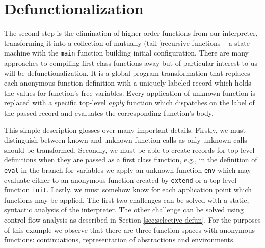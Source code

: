 \section{Defunctionalization}
The second step is the elimination of higher order functions from our interpreter, transforming it into a collection of mutually (tail-)recursive functions -- a state machine with the \lstinline{main} function building initial configuration.
There are many approaches to compiling first class functions away but of particular interest to us will be defunctionalization.
It is a global program transformation that replaces each anonymous function definition with a uniquely labeled record which holds the values for function's free variables.
Every application of unknown function is replaced with a specific top-level \textit{apply} function which dispatches on the label of the passed record and evaluates the corresponding function's body.

This simple description glosses over many important details.
Firstly, we must distinguish between known and unknown function calls as only unknown calls should be transformed.
Secondly, we must be able to create records for top-level definitions when they are passed as a first class function, e.g., in the definition of \lstinline{eval} in the branch for variables we apply an unknown function \lstinline{env} which may evaluate either to an anonymous function created by \lstinline{extend} or a top-level function \lstinline{init}.
Lastly, we must somehow know for each application point which functions may be applied.
The first two challenges can be solved with a static, syntactic analysis of the interpreter.
The other challenge can be solved using control-flow analysis as described in Section \ref{sec:selective-defun}.
For the purposes of this example we observe that there are three function spaces with anonymous functions: continuations, representation of abstractions and environments.

